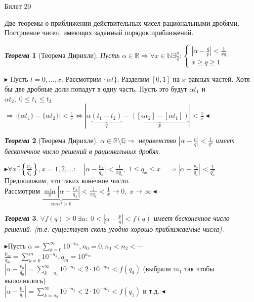 \documentclass[a4paper,12pt]{article}
\newtheorem{teo}{\textit{Теорема}}
\newcommand{\AL}{\alpha}
\newcommand{\q}{\quad}
\newcommand{\pb}{\blacktriangleright}
\newcommand{\pe}{\blacktriangleleft}
\newcommand{\Ra}{\Rightarrow}
\newcommand{\bb}[1]{\mathbb{#1}}
\newcommand{\SL}{\sum\limits}
\begin{document}
\newpage
\begin{mybox2}{\hypertarget{bil20}{Билет 20}}

\begin{formbox}{}
Две теоремы о приближении действительных чисел рациональными дробями. Построение чисел, имеющих заданный порядок приближений.
\end{formbox}


\begin{formbox}{}
\begin{teo}[Теорема Дирихле] Пусть $\AL\in\bb{R}\Ra \forall  x \in\bb{N} \exists \frac{p}{q}: \begin{cases} \left|\AL - \frac{q}{p}\right| < \frac{1}{xq} \\ x \ge q \ge 1   \end{cases} $
\end{teo}
\end{formbox}
$\pb $ Пусть $t = 0,\dots,x$. Рассмотрим $\{\AL t\}$. Разделим $[0,1]$ на $x$ равных частей. Хотя бы две дробные доли попадут в одну часть. Пусть это будут $\AL t_1$ и $\AL t_2,\; 0\le t_1 \le t_2$\\
$\Ra \left| \{\AL t_1\} - \{\AL t_2\}  \right| < \frac{1}{x} \iff \left| \AL \underbrace{(t_1 - t_2)}_q - \underbrace{([\AL t_2] - [\AL t_1])}_p \right| < \frac{1}{x}\pe$

\begin{formbox}{}
\begin{teo}[Теорема Дирихле] $\AL \in \bb{R} \setminus \bb{Q} \Ra $ неравенство $\left|\AL - \frac{p}{q} \right| < \frac{1}{q^2}$ имеет бесконечное число решений в рациональных дробях.
\end{teo}
\end{formbox}
$\pb \forall x \exists \left\{\frac{p_x}{q_x}\right\}, x = 1,2,\dots: \q \left|\AL - \frac{p_x}{q_x} \right| < \frac{1}{x q_x}, \; 1 \le q_x\le x\q\Ra \left|\AL - \frac{p_x}{q_x} \right| < \frac{1}{q_x^2}$\\
Предположим, что таких конечное число. \\Рассмотрим $\underbrace{\min\limits_{x}\left|\AL - \frac{p_x}{q_x} \right|}_{const > 0} < \frac{1}{x q_x} < \frac{1}{x} \to0, \;x\to\infty\pe$

\begin{formbox}{}
\begin{teo} $\forall f(q) > 0\: \exists \AL:\:0 < \left|\AL - \frac{p}{q} \right| < f(q)$ имеет бесконечное число решений. (т.е. существует сколь угодно хорошо приближаемые числа).
\end{teo}
\end{formbox}
$\pb $Пусть $\AL =\SL_{k=0}^\infty 10^{-n_k}, n_0 = 0, n_1 < n_2 < \cdots$\\
$\frac{p_m}{q_m} = \SL_{k=0}^m 10^{-n_k}, q_m = 10^{n_m}$\\
$\left|\AL - \frac{p_0}{q_0} \right| = \SL_{k=n_1}^\infty 10^{-n_k} < 2 \cdot 10^{-m_1} < f(q_0)$ (выбрали $m_1$ так чтобы выполнялось)\\
$\left|\AL - \frac{p_1}{q_1} \right| = \SL_{k=n_2}^\infty 10^{-n_k} < 2 \cdot 10^{-m_2} < f(q_1)$ и т.д. $\pe$

\end{mybox2}
\end{document}
